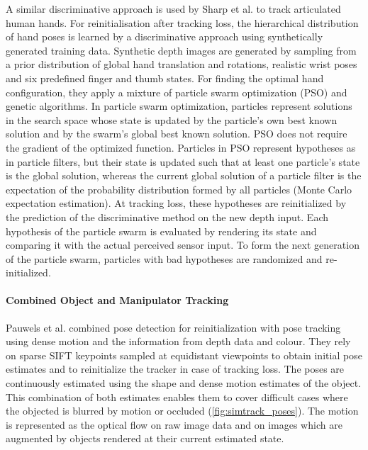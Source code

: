 A similar discriminative approach is used by Sharp et al. \cite{Sharp2015} to track articulated human hands.
For reinitialisation after tracking loss, the hierarchical distribution of hand poses is learned by a discriminative approach using synthetically generated training data.
Synthetic depth images are generated by sampling from a prior distribution of global hand translation and rotations, realistic wrist poses and six predefined finger and thumb states.
For finding the optimal hand configuration, they apply a mixture of particle swarm optimization (PSO) and genetic algorithms. In particle swarm optimization, particles represent solutions in the search space whose state is updated by the particle's own best known solution and by the swarm's global best known solution. PSO does not require the gradient of the optimized function.
Particles in PSO represent hypotheses as in particle filters, but their state is updated such that at least one particle's state is the global solution, whereas the current global solution of a particle filter is the expectation of the probability distribution formed by all particles (Monte Carlo expectation estimation).
At tracking loss, these hypotheses are reinitialized by the prediction of the discriminative method on the new depth input.
Each hypothesis of the particle swarm is evaluated by rendering its state and comparing it with the actual perceived sensor input.
To form the next generation of the particle swarm, particles with bad hypotheses are randomized and re-initialized.

\paragraph{Combined Object and Manipulator Tracking}
Pauwels et al. \cite{Pauwels2015} combined pose detection for reinitialization with pose tracking using dense motion and the information from depth data and colour. They rely on sparse SIFT keypoints sampled at equidistant viewpoints to obtain initial pose estimates and to reinitialize the tracker in case of tracking loss. The poses are continuously estimated using the shape and dense motion estimates of the object. This combination of both estimates enables them to cover difficult cases where the objected is blurred by motion or occluded (\cref{fig:simtrack_poses}).
The motion is represented as the optical flow on raw image data and on images which are augmented by objects rendered at their current estimated state.

